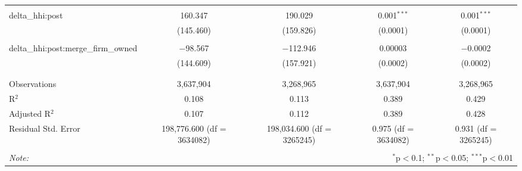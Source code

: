 \begin{table}[H]
{\begin{tabular}{@{\extracolsep{5pt}}lcccc}
   & & & & \\  

  delta\_hhi:post & 160.347 & 190.029 & 0.001$^{***}$ & 0.001$^{***}$ \\  

   & (145.460) & (159.826) & (0.0001) & (0.0001) \\  

   & & & & \\  

  delta\_hhi:post:merge\_firm\_owned & $-$98.567 & $-$112.946 & 0.00003 & $-$0.0002 \\  

   & (144.609) & (157.921) & (0.0002) & (0.0002) \\  

   & & & & \\  

 \hline \\[-1.8ex]  

 Observations & 3,637,904 & 3,268,965 & 3,637,904 & 3,268,965 \\  

 R$^{2}$ & 0.108 & 0.113 & 0.389 & 0.429 \\  

 Adjusted R$^{2}$ & 0.107 & 0.112 & 0.389 & 0.428 \\  

 Residual Std. Error & 198,776.600 (df = 3634082) & 198,034.600 (df = 3265245) & 0.975 (df = 3634082) & 0.931 (df = 3265245) \\  

 \hline  

 \hline \\[-1.8ex]  

 \textit{Note:}  & \multicolumn{4}{r}{$^{*}$p$<$0.1; $^{**}$p$<$0.05; $^{***}$p$<$0.01} \\  

 \end{tabular}}  

 \end{table}  

 



